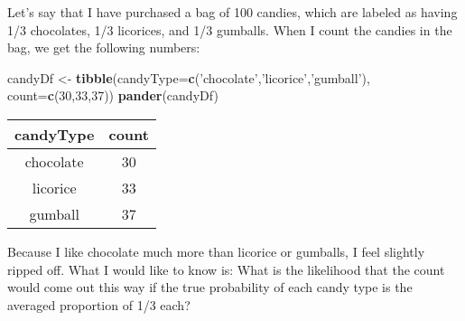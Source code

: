 \documentclass[]{book}
\newenvironment{Shaded}{\begin{snugshade}}{\end{snugshade}}
\newcommand{\KeywordTok}[1]{\textcolor[rgb]{0.13,0.29,0.53}{\textbf{#1}}}
\newcommand{\DataTypeTok}[1]{\textcolor[rgb]{0.13,0.29,0.53}{#1}}
\newcommand{\DecValTok}[1]{\textcolor[rgb]{0.00,0.00,0.81}{#1}}
\newcommand{\StringTok}[1]{\textcolor[rgb]{0.31,0.60,0.02}{#1}}
\newcommand{\NormalTok}[1]{#1}
\theoremstyle{definition}
\theoremstyle{definition}
\theoremstyle{definition}
\theoremstyle{remark}
\begin{document}
Let's say that I have purchased a bag of 100 candies, which are labeled
as having 1/3 chocolates, 1/3 licorices, and 1/3 gumballs. When I count
the candies in the bag, we get the following numbers:

\begin{Shaded}
\begin{Highlighting}[]
\NormalTok{candyDf <-}\StringTok{ }
\StringTok{  }\KeywordTok{tibble}\NormalTok{(}\DataTypeTok{candyType=}\KeywordTok{c}\NormalTok{(}\StringTok{'chocolate'}\NormalTok{,}\StringTok{'licorice'}\NormalTok{,}\StringTok{'gumball'}\NormalTok{),}
         \DataTypeTok{count=}\KeywordTok{c}\NormalTok{(}\DecValTok{30}\NormalTok{,}\DecValTok{33}\NormalTok{,}\DecValTok{37}\NormalTok{))}
\KeywordTok{pander}\NormalTok{(candyDf)}
\end{Highlighting}
\end{Shaded}

\begin{longtable}[]{@{}cc@{}}
\toprule
\begin{minipage}[b]{0.16\columnwidth}\centering\strut
candyType\strut
\end{minipage} & \begin{minipage}[b]{0.09\columnwidth}\centering\strut
count\strut
\end{minipage}\tabularnewline
\midrule
\endhead
\begin{minipage}[t]{0.16\columnwidth}\centering\strut
chocolate\strut
\end{minipage} & \begin{minipage}[t]{0.09\columnwidth}\centering\strut
30\strut
\end{minipage}\tabularnewline
\begin{minipage}[t]{0.16\columnwidth}\centering\strut
licorice\strut
\end{minipage} & \begin{minipage}[t]{0.09\columnwidth}\centering\strut
33\strut
\end{minipage}\tabularnewline
\begin{minipage}[t]{0.16\columnwidth}\centering\strut
gumball\strut
\end{minipage} & \begin{minipage}[t]{0.09\columnwidth}\centering\strut
37\strut
\end{minipage}\tabularnewline
\bottomrule
\end{longtable}

Because I like chocolate much more than licorice or gumballs, I feel
slightly ripped off. What I would like to know is: What is the
likelihood that the count would come out this way if the true
probability of each candy type is the averaged proportion of 1/3 each?
\end{document}

